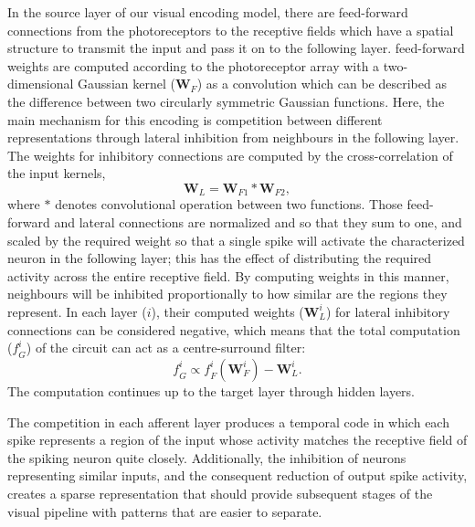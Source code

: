 \documentclass[letterpaper, 10 pt, conference]{ieeeconf}  %
\begin{document}
In the source layer of our visual encoding model, there are feed-forward connections from the photoreceptors to the receptive fields which have a spatial structure to transmit the input and pass it on to the following layer.
feed-forward weights are computed according to the photoreceptor array with a two-dimensional Gaussian kernel ($\mathbf{W}_F$) as a convolution which can be described as the difference between two circularly symmetric
Gaussian functions.
Here, the main mechanism for this encoding is competition between different representations through lateral inhibition from neighbours in the following layer.
The weights for inhibitory connections are computed by the cross-correlation of the input kernels,
%
\begin{equation}
    \mathbf{W}_{L}  = \mathbf{W}_{F1} \ast \mathbf{W}_{F2} ,
\end{equation}
%
where $\ast$ denotes convolutional operation between two functions.
Those feed-forward and lateral connections are normalized and so that they sum to one, and scaled by the required weight so that a single spike will activate the characterized neuron in the following layer; 
this has the effect of distributing the required activity across the entire receptive field. 
By computing weights in this manner, neighbours will be inhibited proportionally to how similar are the regions they represent. 
In each layer ($i$), their computed weights ($\mathbf{W}_L^i$) for lateral inhibitory connections can be considered negative, which means that the total computation ($\mathit{f}_G^i$) of the circuit can act as a centre-surround filter:
%
\begin{equation}
    \mathit{f}_G^i  \varpropto \mathit{f}^i_{F}(\mathbf{W}^i_{F}) - \mathbf{W}_{L}^i .
\end{equation}
%
The computation continues up to the target layer through hidden layers.

The competition in each afferent layer produces a temporal code in which each spike represents a region of the input whose activity matches the receptive field of the spiking neuron quite closely.
Additionally, the inhibition of neurons representing similar inputs, and the consequent reduction of output spike activity, creates a sparse representation that should provide subsequent stages of the visual pipeline with patterns that are easier to separate.
\end{document}
